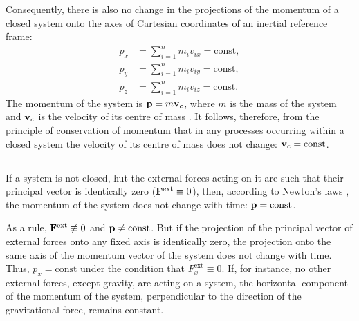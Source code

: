 Consequently, there is also no change in the projections of the momentum of a closed system onto the axes of Cartesian coordi­nates of an inertial reference frame:
\begin{align*}%
p_{x} & = \sum_{i=1}^{n} m_{i} v_{ix} = \textrm{const},\\
p_{y} & = \sum_{i=1}^{n} m_{i} v_{iy} = \textrm{const},\\
p_{z} & = \sum_{i=1}^{n} m_{i} v_{iz} = \textrm{const}.
\end{align*}
The momentum of the system is $\vb{p} = m\vb{v}_{c}$, where $m$ is the mass of the system and $\vb{v}_{c}$ is the velocity of its centre of mass . It follows, therefore, from the principle of conservation of mo­mentum that in any processes occurring within a closed system the velocity of its centre of mass does not change: $\vb{v}_{c} = \textrm{const}$. 

\subsection{}\label{2.7.3} If a system is not closed, hut the external forces acting on it are such that their principal vector is identically zero ($\vb{F}^{\textrm{ext}}\equiv 0$), then, according to Newton's laws , the mo­mentum of the system does not change with time: $\vb{p} = \textrm{const}$.

As a rule, $\vb{F}^{\textrm{ext}}\not\equiv 0$ and $\vb{p} \neq \textrm{const}$. But if the projection of the principal vector of external forces onto any fixed axis is iden­tically zero, the projection onto the same axis of the momentum vector of the system does not change with time. Thus, $p_{x} = \textrm{const}$
under the condition that $F^{\textrm{ext}}_{x} \equiv 0$. If, for instance, no other external forces, except gravity, are acting on a system, the horizontal component of the momentum of the system, perpendicular to the direction of the gravitational force, remains con­stant.

